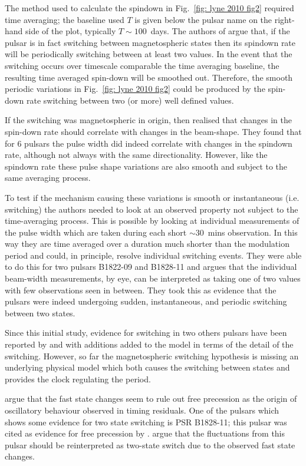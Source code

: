 The method used to calculate the spindown in Fig.~\ref{fig: lyne 2010 fig2}
required time averaging; the baseline used $T$ is given below the pulsar name
on the right-hand side of the plot, typically $T\sim100$~days. The authors of
\citet{Lyne2010} argue that, if the pulsar is in fact switching between
magnetospheric states then its spindown rate will be periodically switching
between at least two values. In the event that the switching occurs over
timescale comparable the time averaging baseline, the resulting time averaged
spin-down will be smoothed out. Therefore, the smooth periodic variations in
Fig.~\ref{fig: lyne 2010 fig2} could be produced by the spin-down rate
switching between two (or more) well defined values.

If the switching was magnetospheric in origin, then \citet{Lyne2010} realised
that changes in the spin-down rate should correlate with changes in the
beam-shape.  They found that for 6 pulsars the pulse width did indeed correlate
with changes in the spindown rate, although not always with the same
directionality.  However, like the spindown rate these pulse shape variations
are also smooth and subject to the same averaging process.

To test if the mechanism causing these variations is smooth or instantaneous
(i.e. switching) the authors needed to look at an observed property not subject
to the time-averaging process.  This is possible by looking at individual
measurements of the pulse width which are taken during each short $\sim30$~mins
observation. In this way they are time averaged over a duration much shorter
than the modulation period and could, in principle, resolve individual
switching events. They were able to do this for two pulsars B1822-09 and
B1828-11 and argues that the individual beam-width measurements, by eye, can be
interpreted as taking one of two values with few observations seen in between.
They took this as evidence that the pulsars were indeed undergoing sudden,
instantaneous, and periodic switching between two states.

Since this initial study, evidence for switching in two others pulsars have
been reported by \citet{Perera2014} and \citet{Perera2016} with additions added
to the model in terms of the detail of the switching. However, so far the
magnetospheric switching hypothesis is missing an underlying physical model
which both causes the switching between states and provides the clock regulating
the period.

\citet{Lyne2010} argue that the fast state changes seem to rule out free
precession as the origin of oscillatory behaviour observed in timing residuals.
One of the pulsars which shows some evidence for two state switching is PSR
B1828-11; this pulsar was cited as evidence for free precession by
\citet{Akgun2006}. \citet{Lyne2010} argue that the fluctuations from this pulsar
should be reinterpreted as two-state switch due to the observed fast state
changes.

